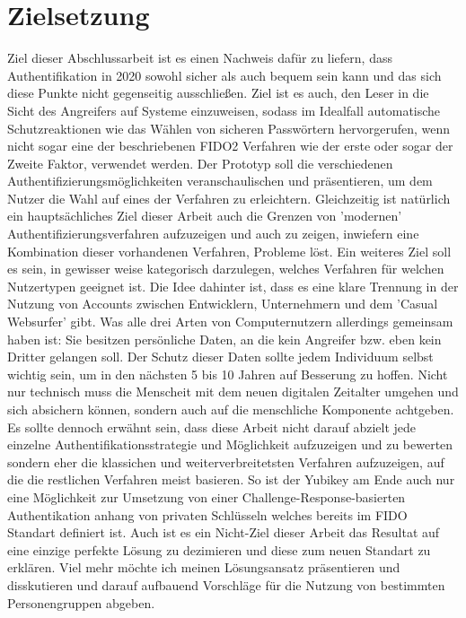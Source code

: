 \section{Zielsetzung}
Ziel dieser Abschlussarbeit ist es einen Nachweis dafür zu liefern, dass Authentifikation in 2020 sowohl sicher als auch bequem sein kann und das sich diese Punkte nicht gegenseitig ausschließen. Ziel ist es auch, den Leser in die Sicht des Angreifers auf Systeme einzuweisen, sodass im Idealfall automatische Schutzreaktionen wie das Wählen von sicheren Passwörtern hervorgerufen, wenn nicht sogar eine der beschriebenen FIDO2 Verfahren wie der erste oder sogar der Zweite Faktor, verwendet werden. Der Prototyp soll die verschiedenen Authentifizierungsmöglichkeiten veranschaulischen und präsentieren, um dem Nutzer die Wahl auf eines der Verfahren zu erleichtern. Gleichzeitig ist natürlich ein hauptsächliches Ziel dieser Arbeit auch die Grenzen von 'modernen' Authentifizierungsverfahren aufzuzeigen und auch zu zeigen, inwiefern eine Kombination dieser vorhandenen Verfahren, Probleme löst. Ein weiteres Ziel soll es sein, in gewisser weise kategorisch darzulegen, welches Verfahren für welchen Nutzertypen geeignet ist. Die Idee dahinter ist, dass es eine klare Trennung in der Nutzung von Accounts zwischen Entwicklern, Unternehmern und dem 'Casual Websurfer' gibt. Was alle drei Arten von Computernutzern allerdings gemeinsam haben ist: Sie besitzen persönliche Daten, an die kein Angreifer bzw. eben kein Dritter gelangen soll. Der Schutz dieser Daten sollte jedem Individuum selbst wichtig sein, um in den nächsten 5 bis 10 Jahren auf Besserung zu hoffen. Nicht nur technisch muss die Menscheit mit dem neuen digitalen Zeitalter umgehen und sich absichern können, sondern auch auf die menschliche Komponente achtgeben. Es sollte dennoch erwähnt sein, dass diese Arbeit nicht darauf abzielt jede einzelne Authentifikationsstrategie und Möglichkeit aufzuzeigen und zu bewerten sondern eher die klassichen und weiterverbreitetsten Verfahren aufzuzeigen, auf die die restlichen Verfahren meist basieren. So ist der Yubikey am Ende auch nur eine Möglichkeit zur Umsetzung von einer Challenge-Response-basierten Authentikation anhang von privaten Schlüsseln welches bereits im FIDO Standart definiert ist. Auch ist es ein Nicht-Ziel dieser Arbeit das Resultat auf eine einzige perfekte Lösung zu dezimieren und diese zum neuen Standart zu erklären. Viel mehr möchte ich meinen Lösungsansatz präsentieren und disskutieren und darauf aufbauend Vorschläge für die Nutzung von bestimmten Personengruppen abgeben.
